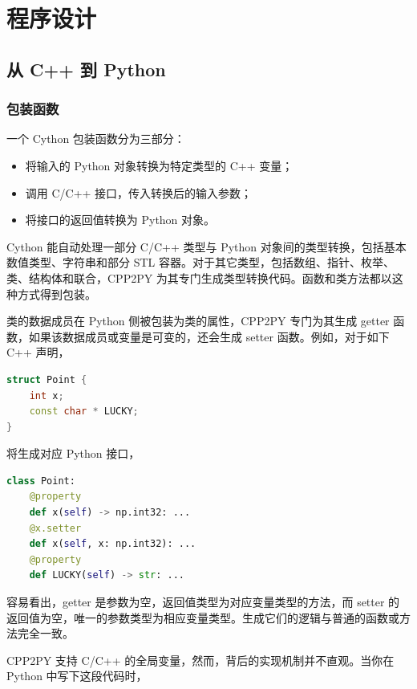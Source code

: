 
\chapter{程序设计}

\section{从 C++ 到 Python}

\subsection{包装函数}
一个 Cython 包装函数分为三部分：

\begin{itemize}
    \item 将输入的 Python 对象转换为特定类型的 C++ 变量；
    \item 调用 C/C++ 接口，传入转换后的输入参数；
    \item 将接口的返回值转换为 Python 对象。
\end{itemize}

Cython 能自动处理一部分 C/C++ 类型与 Python 对象间的类型转换，包括基本数值类型、字符串和部分 STL 容器。对于其它类型，包括数组、指针、枚举、类、结构体和联合，CPP2PY 为其专门生成类型转换代码。函数和类方法都以这种方式得到包装。

类的数据成员在 Python 侧被包装为类的属性，CPP2PY 专门为其生成 getter 函数，如果该数据成员或变量是可变的，还会生成 setter 函数。例如，对于如下 C++ 声明，
\begin{framed}
\begin{lstlisting}[language=c++]
struct Point {
    int x;
    const char * LUCKY;
}
\end{lstlisting}
\end{framed}将生成对应 Python 接口，

\begin{framed}
\begin{lstlisting}[language=Python]
class Point:
    @property
    def x(self) -> np.int32: ...
    @x.setter
    def x(self, x: np.int32): ...
    @property
    def LUCKY(self) -> str: ...
\end{lstlisting}
\end{framed}
容易看出，getter 是参数为空，返回值类型为对应变量类型的方法，而 setter 的返回值为空，唯一的参数类型为相应变量类型。生成它们的逻辑与普通的函数或方法完全一致。

CPP2PY 支持 C/C++ 的全局变量，然而，背后的实现机制并不直观。当你在 Python 中写下这段代码时，

